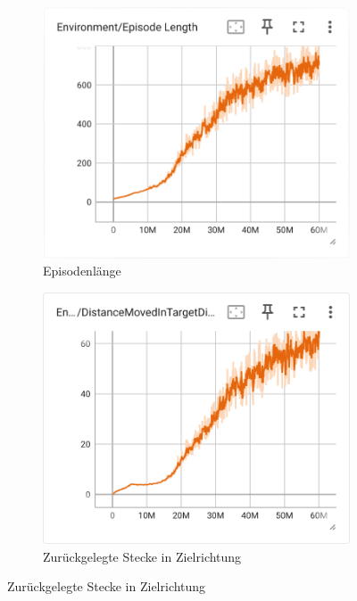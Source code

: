 \begin{figure}[H]
  \centering  
    \begin{subfigure}{.49\textwidth}
      \centering  
      \includegraphics[width=\textwidth]{img/106_episode_length}
      \caption{Episodenlänge}
      \label{fig:106_episode_length}
    \end{subfigure}
    \begin{subfigure}{.49\textwidth}
      \centering  
      \includegraphics[width=\textwidth]{img/106_move_target_dir}
      \caption{Zurückgelegte Stecke in Zielrichtung}
      \label{fig:106_move_target_dir}

\end{subfigure}
\end{figure}
